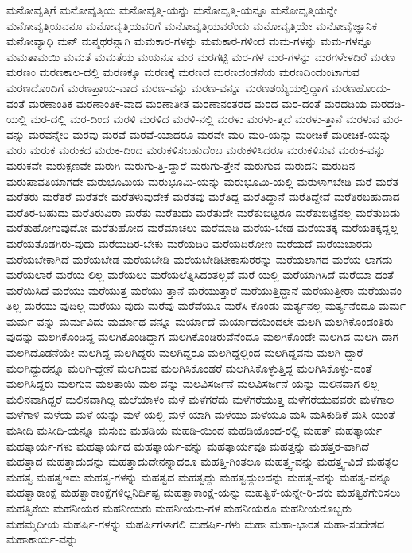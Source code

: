 {ಮನೋವೃತ್ತಿಗೆ
ಮನೋವೃತ್ತಿಯ
ಮನೋವೃತ್ತಿ-ಯನ್ನು
ಮನೋವೃತ್ತಿ-ಯನ್ನೂ
ಮನೋವೃತ್ತಿಯನ್ನೇ
ಮನೋವೃತ್ತಿಯವನೂ
ಮನೋವೃತ್ತಿಯವರಿಗೆ
ಮನೋವೃತ್ತಿಯವರೆಂದು
ಮನೋವೃತ್ತಿಯೇ
ಮನೋವೈಜ್ಞಾನಿಕ
ಮನೋವ್ಯಾಧಿ
ಮನ್
ಮನ್ಮಥರನ್ನಾಗಿ
ಮಮಕಾರ-ಗಳನ್ನು
ಮಮಕಾರ-ಗಳಿಂದ
ಮಮ-ಗಳನ್ನು
ಮಮ-ಗಳನ್ನೂ
ಮಮತಾಮಯಿ
ಮಮತೆ
ಮಮತೆಯ
ಮಯನೂ
ಮರ
ಮರಗಟ್ಟಿ
ಮರ-ಗಳ
ಮರ-ಗಳನ್ನು
ಮರಗಳೇಳದಿರೆ
ಮರಣ
ಮರಣಂ
ಮರಣಕಾಲ-ದಲ್ಲಿ
ಮರಣಕ್ಕೂ
ಮರಣಕ್ಕೆ
ಮರಣದ
ಮರಣದಂಡನೆಯ
ಮರಣದಿಂದುಂಟಾಗುವ
ಮರಣದೊಂದಿಗೆ
ಮರಣಪ್ರಾಯ-ವಾದ
ಮರಣ-ವನ್ನು
ಮರಣ-ವನ್ನೂ
ಮರಣಶಯ್ಯೆಯಲ್ಲಿದ್ದಾಗ
ಮರಣಹೊಂದು-ವಂತೆ
ಮರಣಾಂತಿಕ
ಮರಣಾಂತಿಕ-ವಾದ
ಮರಣಾತೀತ
ಮರಣಾನಂತರದ
ಮರದ
ಮರ-ದಂತೆ
ಮರದಡಿಯ
ಮರದಡಿ-ಯಲ್ಲಿ
ಮರ-ದಲ್ಲಿ
ಮರ-ದಿಂದ
ಮರಳಿ
ಮರಳಿದ
ಮರಳಿ-ನಲ್ಲಿ
ಮರಳು
ಮರಳು-ತ್ತದೆ
ಮರಳು-ತ್ತಾನೆ
ಮರಳುವ
ಮರ-ವನ್ನು
ಮರವನ್ನೇರಿ
ಮರವು
ಮರವೆ
ಮರವೆ-ಯಾದರೂ
ಮರವೇ
ಮರಿ
ಮರಿ-ಯನ್ನು
ಮರೀಚಿಕೆ
ಮರೀಚಿಕೆ-ಯನ್ನು
ಮರು
ಮರುಕ
ಮರುಕದ
ಮರುಕ-ದಿಂದ
ಮರುಕಳಿಸಬಹುದೆಂಬ
ಮರುಕಳಿಸಿದರೂ
ಮರುಕಳಿಸುವ
ಮರುಕ-ವನ್ನು
ಮರುಕವೇ
ಮರುಕ್ಷಣವೇ
ಮರುಗಿ
ಮರುಗು-ತ್ತಿ-ದ್ದಾರೆ
ಮರುಗು-ತ್ತೇನೆ
ಮರುಗುವ
ಮರುದನಿ
ಮರುದಿನ
ಮರುಪಾವತಿಯಾಗದೇ
ಮರುಭೂಮಿಯ
ಮರುಭೂಮಿ-ಯನ್ನು
ಮರುಭೂಮಿ-ಯಲ್ಲಿ
ಮರುಳಾಗಬೇಡಿ
ಮರೆ
ಮರೆತ
ಮರೆತರು
ಮರೆತರೆ
ಮರೆತರೇ
ಮರೆತಳುವುದೇಕೆ
ಮರೆತವು
ಮರೆತಿದ್ದ
ಮರೆತಿದ್ದಾನೆ
ಮರೆತಿದ್ದೇವೆ
ಮರೆತಿರಬಹುದಾದ
ಮರೆತಿರ-ಬಹುದು
ಮರೆತಿರುವಿರಾ
ಮರೆತು
ಮರೆತುದು
ಮರೆತುದೇ
ಮರೆತುಬಿಟ್ಟರೂ
ಮರೆತುಬಿಟ್ಟೆನಲ್ಲ
ಮರೆತುಬಿಡು
ಮರೆತುಹೋಗುವುದೋ
ಮರೆತುಹೋದ
ಮರೆಮಾಚಲು
ಮರೆಮಾಡಿ
ಮರೆಯ-ಬೇಡ
ಮರೆಯತಕ್ಕ
ಮರೆಯತಕ್ಕದ್ದಲ್ಲ
ಮರೆಯತೊಡಗಿರು-ವುದು
ಮರೆಯದಿರ-ಬೇಕು
ಮರೆಯದಿರಿ
ಮರೆಯದಿರೋಣ
ಮರೆಯದೆ
ಮರೆಯಬಾರದು
ಮರೆಯಬೇಕಾಗಿದೆ
ಮರೆಯಬೇಡ
ಮರೆಯಬೇಡಿ
ಮರೆಯಬೇಡಿಟೀಕಾಸುರರನ್ನು
ಮರೆಯಲಾಗದ
ಮರೆಯ-ಲಾಗದು
ಮರೆಯಲಾರೆ
ಮರೆಯ-ಲಿಲ್ಲ
ಮರೆಯಲು
ಮರೆಯಲೆತ್ನಿಸಿದಂತಲ್ಲವೆ
ಮರೆ-ಯಲ್ಲಿ
ಮರೆಯಾಗಿಸಿದೆ
ಮರೆಯಾ-ದಂತೆ
ಮರೆಯಿಸಿದೆ
ಮರೆಯು
ಮರೆಯುತ್ತ
ಮರೆಯು-ತ್ತಾನೆ
ಮರೆಯುತ್ತಾರೆ
ಮರೆಯುತ್ತಿದ್ದಾನೆ
ಮರೆಯುತ್ತೀರಾ
ಮರೆಯುವಂ-ತಿಲ್ಲ
ಮರೆಯು-ವುದಿಲ್ಲ
ಮರೆಯು-ವುದು
ಮರೆವು
ಮರೆವೆಯೂ
ಮರೆಸಿ-ಕೊಂಡು
ಮರ್ತ್ಯನಲ್ಲ
ಮರ್ತ್ಯನೆಂದೂ
ಮರ್ಮ
ಮರ್ಮ-ವನ್ನು
ಮರ್ಮವಿದು
ಮರ್ಮಾಥ-ವನ್ನೂ
ಮರ್ಯಾದೆ
ಮರ್ಯಾದೆಯಿಂದಲೇ
ಮಲಗಿ
ಮಲಗಿಕೊಂಡಂತಿರು-ವುದನ್ನು
ಮಲಗಿಕೊಂಡಿದ್ದ
ಮಲಗಿಕೊಂಡಿದ್ದಾಗ
ಮಲಗಿಕೊಂಡಿರುವೆನೆಂದೂ
ಮಲಗಿಕೊಂಡೇ
ಮಲಗಿದ
ಮಲಗಿ-ದಾಗ
ಮಲಗಿದೊಡನೆಯೇ
ಮಲಗಿದ್ದ
ಮಲಗಿದ್ದರು
ಮಲಗಿದ್ದರೂ
ಮಲಗಿದ್ದಲ್ಲಿಂದ
ಮಲಗಿದ್ದವನು
ಮಲಗಿ-ದ್ದಾರೆ
ಮಲಗಿದ್ದುದನ್ನೂ
ಮಲಗಿ-ದ್ದೇನೆ
ಮಲಗಿರುವ
ಮಲಗಿಸಿಕೊಂಡರೆ
ಮಲಗಿಸಿಕೊಳ್ಳುತ್ತಿದ್ದ
ಮಲಗಿಸಿಕೊಳ್ಳು-ವಂತೆ
ಮಲಗಿಸಿದ್ದರು
ಮಲಗುವ
ಮಲತಾಯಿ
ಮಲ-ವನ್ನು
ಮಲವಿಸರ್ಜನೆ
ಮಲವಿಸರ್ಜನೆ-ಯನ್ನು
ಮಲಿನವಾಗ-ಲಿಲ್ಲ
ಮಲಿನವಾಗಿದ್ದರೆ
ಮಲಿನವಾಗಿಲ್ಲ
ಮಲೆಯಾಳಂ
ಮಳೆ
ಮಳೆಗರೆದು
ಮಳೆಗರೆಯುತ್ತ
ಮಳೆಗರೆಯುವವರೇ
ಮಳೆಗಾಲ
ಮಳೆಗಾಳಿ
ಮಳೆಯ
ಮಳೆ-ಯನ್ನು
ಮಳೆ-ಯಲ್ಲಿ
ಮಳೆ-ಯಾಗಿ
ಮಳೆಯು
ಮಳೆಯೂ
ಮಸಿ
ಮಸಿಕುಡಿಕೆ
ಮಸಿ-ಯಂತೆ
ಮಸೀದಿ
ಮಸೀದಿ-ಯನ್ನೂ
ಮಸುಕು
ಮಹಡಿಯ
ಮಹಡಿ-ಯಿಂದ
ಮಹಡಿಯೊಂದ-ರಲ್ಲಿ
ಮಹತ್
ಮಹತ್ಕಾರ್ಯ
ಮಹತ್ಕಾರ್ಯ-ಗಳು
ಮಹತ್ಕಾರ್ಯದ
ಮಹತ್ಕಾರ್ಯ-ವನ್ನು
ಮಹತ್ಕಾರ್ಯವೂ
ಮಹತ್ತನ್ನು
ಮಹತ್ತರ-ವಾಗಿದೆ
ಮಹತ್ತಾದ
ಮಹತ್ತಾದುದನ್ನು
ಮಹತ್ತಾದುದೇನನ್ನಾದರೂ
ಮಹತ್ತಿ-ಗಿಂತಲೂ
ಮಹತ್ತ್ವ-ವನ್ನು
ಮಹತ್ತ್ವ-ವಿದೆ
ಮಹತ್ಫಲ
ಮಹತ್ವ
ಮಹತ್ವಇದು
ಮಹತ್ವ-ಗಳನ್ನು
ಮಹತ್ವದ
ಮಹತ್ವದ್ದು
ಮಹತ್ವದ್ದುಅದನ್ನು
ಮಹತ್ವ-ವನ್ನು
ಮಹತ್ವ-ವನ್ನೂ
ಮಹತ್ವಾಕಾಂಕ್ಷೆ
ಮಹತ್ವಾಕಾಂಕ್ಷೆಗಳಿಲ್ಲನಿರ್ದಿಷ್ಟ
ಮಹತ್ವಾಕಾಂಕ್ಷೆ-ಯನ್ನು
ಮಹತ್ವಿಕೆ-ಯನ್ನೇ-ರಿ-ದರು
ಮಹತ್ವಿಕೆಗೇರಿಸಲು
ಮಹತ್ವಿಕೆಯ
ಮಹನೀಯರ
ಮಹನೀಯರು
ಮಹನೀಯರು-ಗಳ
ಮಹನೀಯರೂ
ಮಹನೀಯರೊಬ್ಬರು
ಮಹಮ್ಮದೀಯ
ಮಹರ್ಷಿ-ಗಳನ್ನು
ಮಹರ್ಷಿಗಳಾಗಲಿ
ಮಹರ್ಷಿ-ಗಳು
ಮಹಾ
ಮಹಾ-ಭಾರತ
ಮಹಾ-ಸಂದೇಶದ
ಮಹಾಕಾರ್ಯ-ವನ್ನು
}
